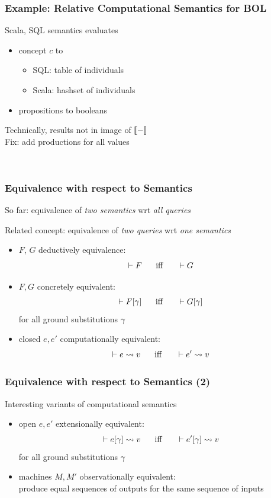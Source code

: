 \begin{frame}\frametitle{Example: Relative Computational Semantics for BOL}
Scala, SQL semantics evaluates
\begin{itemize}
\item concept $c$ to
\begin{itemize}
\item SQL: table of individuals
\item Scala: hashset of individuals
\end{itemize}
\item propositions to booleans 
\end{itemize}

Technically, results not in image of $\llbracket -\rrbracket$\\
Fix: add productions for all values
\begin{commgrammar}
\\
\end{commgrammar}
\end{frame}

\begin{frame}\frametitle{Equivalence with respect to Semantics}
So far: equivalence of \emph{two semantics} wrt \emph{all queries}

Related concept: equivalence of \emph{two queries} wrt \emph{one semantics}
\begin{itemize}
\item $F$, $G$ deductively equivalence: \[\vdash F \hspace*{.5cm}\;\mathrm{iff}\;\hspace*{.5cm} \vdash G\]
\item $F,G$ concretely equivalent: \[\vdash F[\gamma] \hspace*{.5cm}\;\mathrm{iff}\;\hspace*{.5cm} \vdash G[\gamma]\] for all ground substitutions $\gamma$
\item closed $e,e'$ computationally equivalent: \[\vdash e\rightsquigarrow v \hspace*{.5cm}\;\mathrm{iff}\;\hspace*{.5cm} \vdash e'\rightsquigarrow v\]
\end{itemize}
\end{frame}

\begin{frame}\frametitle{Equivalence with respect to Semantics (2)}
Interesting variants of computational semantics
\begin{itemize}
\item open $e,e'$ extensionally equivalent:
  \[\vdash e[\gamma]\rightsquigarrow v \hspace*{.5cm}\;\mathrm{iff}\;\hspace*{.5cm} \vdash e'[\gamma]\rightsquigarrow v\]
  for all ground substitutions $\gamma$
\item machines $M,M'$ observationally equivalent: \\
  produce equal sequences of outputs for the same sequence of inputs
\end{itemize}

\end{frame}

